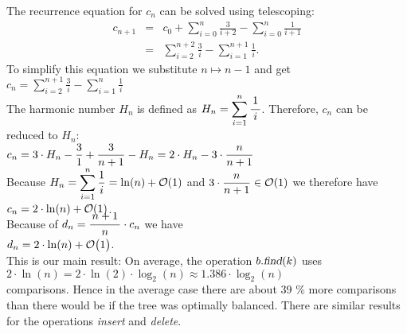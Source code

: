 The recurrence equation for $c_n$ can be solved using  telescoping:
\begin{eqnarray*}  
  c_{n+1} & = & c_0 + \sum\limits_{i=0}^{n} \frac{3}{i+2} - \sum\limits_{i=0}^{n} \frac{1}{i+1} 
\\[0.2cm]
          & = & \sum\limits_{i=2}^{n+2} \frac{3}{i} - \sum\limits_{i=1}^{n+1} \frac{1}{i}.
\end{eqnarray*}
To simplify this equation we substitute $n \mapsto n-1$ and get
\\[0.2cm]
\hspace*{1.3cm}
$c_{n} =  \displaystyle\sum\limits_{i=2}^{n+1} \frac{3}{i} - \sum\limits_{i=1}^{n} \frac{1}{i}$
\\[0.2cm]
The harmonic number  $H_n$ is defined as 
$H_n = \ds\sum\limits_{i=1}^{n} \bruch{1}{i}$.   
Therefore,  $c_n$ can be reduced to $H_n$: 
\\[0.2cm]
\hspace*{1.3cm}
$c_n = \displaystyle 3 \cdot H_n - \frac{3}{1} + \frac{3}{n+1} - H_n  =  \displaystyle 2 \cdot H_n - 3 \cdot \frac{n}{n+1}$
\\[0.2cm] 
Because $H_n = \displaystyle\sum\limits_{i=1}^{n} \frac{1}{i} = \ln(n) + \mathcal{O}(1)$ and $\displaystyle 3 \cdot\frac{n}{n+1} \in \mathcal{O}(1)$
we therefore have
  \\[0.3cm]
\hspace*{1.3cm} 
$\displaystyle c_n = 2 \cdot \ln(n) + \mathcal{O}(1)$.
\\[0.3cm]
Because of  $d_n = \bruch{n+1}{n}\cdot c_n$ we have \\[0.2cm]
\hspace*{1.3cm}
 $\displaystyle d_n = 2 \cdot \ln(n) + \mathcal{O}\bigl(1\bigr)$.
\\[0.2cm]
This is our main result:  On average, the operation $b.\textsl{find}(k)$ uses
\\[0.2cm]
\hspace*{1.3cm}
$2 \cdot \ln(n) = 2 \cdot \ln(2) \cdot \log_2(n) \approx 1.386 \cdot \log_2(n)$ 
\\[0.2cm]
comparisons.  Hence in the average case there are about  39 \% 
more comparisons than there would be if the tree was optimally balanced.
There are similar results for the operations \textsl{insert} and \textsl{delete}.



